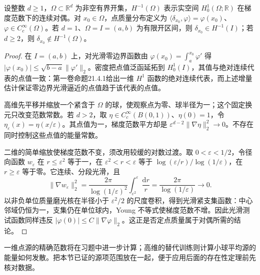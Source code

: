 \begin{proposition}[点质量与能量对偶]\label{b2:prop:15-point-mass-dimension}
设整数 \(d\geq1\)，\(\Omega\subset\mathbb R^d\) 为非空有界开集，\(H^{-1}(\Omega)\) 表示实空间 \(H_0^1(\Omega;\mathbb R)\) 在梯度范数下的连续对偶。对 \(x_0\in\Omega\)，点质量分布定义为 \(\langle\delta_{x_0},\varphi\rangle=\varphi(x_0)\)、\(\varphi\in C_c^\infty(\Omega)\)。若 \(d=1\)、\(\Omega=I=(a,b)\) 为有限开区间，则 \(\delta_{x_0}\in H^{-1}(I)\)；若 \(d\geq2\)，则 \(\delta_{x_0}\notin H^{-1}(\Omega)\)。
\end{proposition}
\begin{proof}
在 \(I=(a,b)\) 上，对光滑零边界函数由
\(\varphi(x_0)=\int_a^{x_0}\varphi'\) 得
\(|\varphi(x_0)|\leq\sqrt{b-a}\|\varphi'\|_2\)。密度把点值泛函延拓到 \(H_0^1(I)\)，其值与绝对连续代表的点值一致：第一卷命题21.4.1给出一维 \(H^1\) 函数的绝对连续代表，而上述增量估计保证零边界光滑逼近的点值趋于该代表的点值。

高维先平移并缩放一个紧含于 \(\Omega\) 的球，使观察点为零、球半径为一；这个固定换元只改变范数常数。若 \(d>2\)，取 \(\eta\in C_c^\infty(B(0,1))\)、\(\eta(0)=1\)，令 \(\eta_\varepsilon(x)=\eta(x/\varepsilon)\)。其点值为一，梯度范数平方却是 \(\varepsilon^{d-2}\|\nabla\eta\|_2^2\to0\)。不存在同时控制这些点值的能量常数。

二维的简单缩放使梯度范数不变，须改用较缓的对数过渡。取 \(0<\varepsilon<1/2\)，令径向函数 \(w_\varepsilon\) 在 \(r\leq\varepsilon^2\) 等于一，在 \(\varepsilon^2<r<\varepsilon\) 等于 \(\log(\varepsilon/r)/\log(1/\varepsilon)\)，在 \(r\geq\varepsilon\) 等于零。它连续、分段光滑，且
\[
 \|\nabla w_\varepsilon\|_2^2
 =\frac{2\pi}{\log(1/\varepsilon)^2}
   \int_{\varepsilon^2}^{\varepsilon}\frac{\mathrm dr}{r}
 =\frac{2\pi}{\log(1/\varepsilon)}\longrightarrow0.
\]
以非负单位质量磨光核在半径小于 \(\varepsilon^2/2\) 的尺度卷积，得到光滑紧支集函数：中心邻域仍恒为一，支集仍在单位球内，Young 不等式使梯度范数不增。因此光滑测试函数同样违反 \(|\varphi(0)|\leq C\|\nabla\varphi\|_2\)。这正是否定点质量属于对偶所需的结论。
\end{proof}
一维点源的精确范数将在习题中进一步计算；高维的替代训练则计算小球平均源的能量如何发散。把本节已证的源项范围放在一起，便于应用后面的存在性定理前先核对数据。

